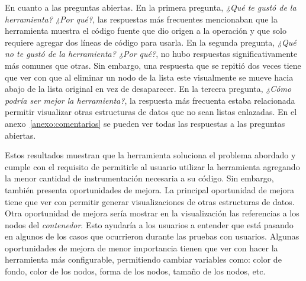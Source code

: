 En cuanto a las preguntas abiertas. En la primera pregunta, \textit{¿Qué te gustó de la herramienta? ¿Por qué?}, las respuestas más frecuentes mencionaban que la herramienta muestra el código fuente que dio origen a la operación y que solo requiere agregar dos líneas de código para usarla. En la segunda pregunta, \textit{¿Qué no te gustó de la herramienta? ¿Por qué?}, no hubo respuestas significativamente más comunes que otras. Sin embargo, una respuesta que se repitió dos veces tiene que ver con que al eliminar un nodo de la lista este visualmente se mueve hacia abajo de la lista original en vez de desaparecer. En la tercera pregunta, \textit{¿Cómo podría ser mejor la herramienta?}, la respuesta más frecuenta estaba relacionada permitir visualizar otras estructuras de datos que no sean listas enlazadas. En el anexo~\ref{anexo:comentarios} se pueden ver todas las respuestas a las preguntas abiertas.

Estos resultados muestran que la herramienta soluciona el problema abordado y cumple con el requisito de permitirle al usuario utilizar la herramienta agregando la menor cantidad de instrumentación necesaria a su código. Sin embargo, también presenta oportunidades de mejora. La principal oportunidad de mejora tiene que ver con permitir generar visualizaciones de otras estructuras de datos. Otra oportunidad de mejora sería mostrar en la visualización las referencias a los nodos del \textit{contenedor}. Esto ayudaría a los usuarios a entender que está pasando en algunos de los casos que ocurrieron durante las pruebas con usuarios. Algunas oportunidades de mejora de menor importancia tienen que ver con hacer la herramienta más configurable, permitiendo cambiar variables como: color de fondo, color de los nodos, forma de los nodos, tamaño de los nodos, etc.

